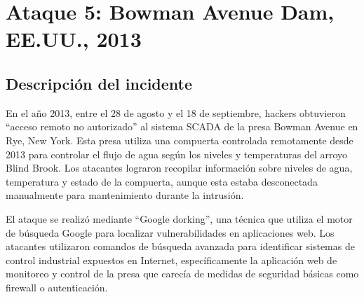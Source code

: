 \newpage
\section{Ataque 5: Bowman Avenue Dam, EE.UU., 2013}

\begin{paracol}{2}
    
    \subsection{Descripción del incidente}

    \colfill
    En el año 2013, entre el 28 de agosto y el 18 de septiembre, hackers obtuvieron ``acceso remoto no autorizado'' al sistema SCADA de la presa Bowman Avenue en Rye, New York. Esta presa utiliza una compuerta controlada remotamente desde 2013 para controlar el flujo de agua según los niveles y temperaturas del arroyo Blind Brook. Los atacantes lograron recopilar información sobre niveles de agua, temperatura y estado de la compuerta, aunque esta estaba desconectada manualmente para mantenimiento durante la intrusión.

    El ataque se realizó mediante ``Google dorking'', una técnica que utiliza el motor de búsqueda Google para localizar vulnerabilidades en aplicaciones web. Los atacantes utilizaron comandos de búsqueda avanzada para identificar sistemas de control industrial expuestos en Internet, específicamente la aplicación web de monitoreo y control de la presa que carecía de medidas de seguridad básicas como firewall o autenticación.


    
    
    \colfill

    \switchcolumn


\end{paracol}
